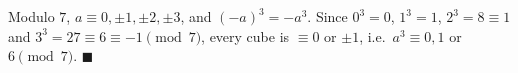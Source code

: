 Modulo $7$, $a\equiv0,\pm1,\pm2,\pm3$, and $(-a)^3=-a^3$. Since $0^3=0$, $1^3=1$, $2^3=8\equiv1$ and $3^3=27\equiv6\equiv-1\pmod7$, every cube is $\equiv0$ or $\pm1$, i.e.\ $a^3\equiv0,1$ or $6\pmod7$. $\blacksquare$

